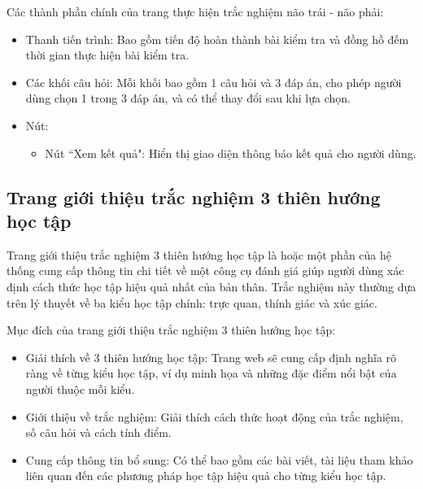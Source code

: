 Các thành phần chính của trang thực hiện trắc nghiệm não trái - não phải:
\begin{itemize}
    \item Thanh tiến trình: Bao gồm tiến độ hoàn thành bài kiểm tra và đồng hồ đếm thời gian thực hiện bài kiểm tra.
    \item Các khối câu hỏi: Mỗi khối bao gồm 1 câu hỏi và 3 đáp án, cho phép người dùng chọn 1 trong 3 đáp án, và có thể thay đổi sau khi lựa chọn.
    \item Nút:
        \begin{itemize}
            \item Nút ``Xem kết quả": Hiển thị giao diện thông báo kết quả cho người dùng.
        \end{itemize}
\end{itemize}


\subsection{Trang giới thiệu trắc nghiệm 3 thiên hướng học tập}
Trang giới thiệu trắc nghiệm 3 thiên hướng học tập là hoặc một phần của hệ thống cung cấp thông tin chi tiết về một công cụ đánh giá giúp người dùng xác định cách thức học tập hiệu quả nhất của bản thân. Trắc nghiệm này thường dựa trên lý thuyết về ba kiểu học tập chính: trực quan, thính giác và xúc giác.

Mục đích của trang giới thiệu trắc nghiệm 3 thiên hướng học tập:
\begin{itemize}
    \item Giải thích về 3 thiên hướng học tập: Trang web sẽ cung cấp định nghĩa rõ ràng về từng kiểu học tập, ví dụ minh họa và những đặc điểm nổi bật của người thuộc mỗi kiểu.
    \item Giới thiệu về trắc nghiệm: Giải thích cách thức hoạt động của trắc nghiệm, số câu hỏi và cách tính điểm.
    \item Cung cấp thông tin bổ sung: Có thể bao gồm các bài viết, tài liệu tham khảo liên quan đến các phương pháp học tập hiệu quả cho từng kiểu học tập.
\end{itemize}


